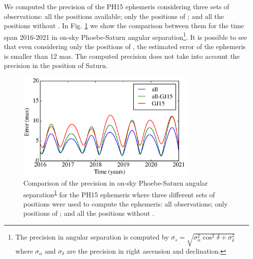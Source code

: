 \documentclass[useAMS,usenatbib]{mn2e}
\begin{document}
We computed the precision of the PH15 ephemeris considering three sets of observations: all the positions available; only the positions of ; and all the positions without . In Fig. \ref{Fig:err-Phoebe} we show the comparison between them for the time span 2016-2021 in on-sky Phoebe-Saturn angular separation\footnote{\label{ft-angsep}The precision in angular separation is computed  by $\sigma_s = \sqrt{\sigma^2_{\alpha} \cos^2 \delta + \sigma^2_{\delta}}$ where $\sigma_{\alpha}$ and $\sigma_{\delta}$ are the precision in right ascension and declination.}. It is possible to see that even considering only the positions of , the estimated error of the ephemeris is smaller than 12 mas. The computed precision does not take into account the precision in the position of Saturn.

\begin{figure}
\begin{centering}
\includegraphics[width=8.8cm]{figures/PH15_err_angsep.eps}  
\caption{Comparison of the precision in on-sky Phoebe-Saturn angular separation\textsuperscript{\ref{ft-angsep}} for the PH15 ephemeris where three different sets of positions were used to compute the ephemeris: all observations; only positions of ; and all the positions without .}
\label{Fig:err-Phoebe}
\end{centering}
\end{figure}
\end{document}
